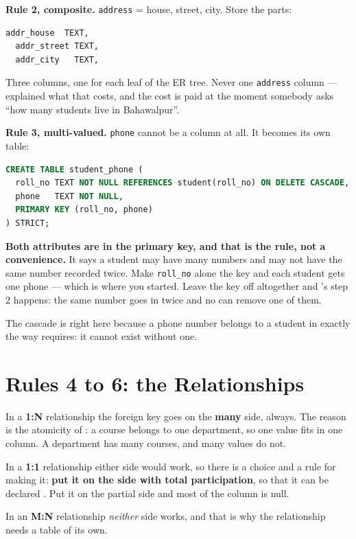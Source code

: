 \begin{examplebox}
\textbf{Rule 2, composite.} \texttt{address} = house, street, city. Store the
parts:

\begin{lstlisting}[language=sql]
  addr_house  TEXT,
  addr_street TEXT,
  addr_city   TEXT,
\end{lstlisting}

Three columns, one for each leaf of the ER tree. Never one \texttt{address}
column ---  explained what that costs, and the cost is paid at
the moment somebody asks ``how many students live in Bahawalpur''.

\medskip
\textbf{Rule 3, multi-valued.} \texttt{phone} cannot be a column at all. It
becomes its own table:

\medskip
{}

\begin{lstlisting}[language=sql]
CREATE TABLE student_phone (
  roll_no TEXT NOT NULL REFERENCES student(roll_no) ON DELETE CASCADE,
  phone   TEXT NOT NULL,
  PRIMARY KEY (roll_no, phone)
) STRICT;
\end{lstlisting}

\smallskip
\textbf{Both attributes are in the primary key, and that is the rule, not a
convenience.} It says a student may have many numbers and may not have the
same number recorded twice. Make \texttt{roll\_no} alone the key and each
student gets one phone --- which is where you started. Leave the key off
altogether and 's step 2 happens: the same number goes in
twice and no  can remove one of them.

\smallskip
The cascade is right here because a phone number belongs to a student in
exactly the way  requires: it cannot exist without one.
\end{examplebox}

\section{Rules 4 to 6: the Relationships}

\begin{definitionbox}
In a \textbf{1:N} relationship the foreign key goes on the \textbf{many} side,
always. The reason is the atomicity of : a course belongs to
one department, so one value fits in one column. A department has many courses,
and many values do not.

\smallskip
In a \textbf{1:1} relationship either side would work, so there is a choice and
a rule for making it: \textbf{put it on the side with total participation}, so
that it can be declared . Put it on the partial side and most
of the column is null.

\smallskip
In an \textbf{M:N} relationship \emph{neither} side works, and that is why the
relationship needs a table of its own.
\end{definitionbox}


